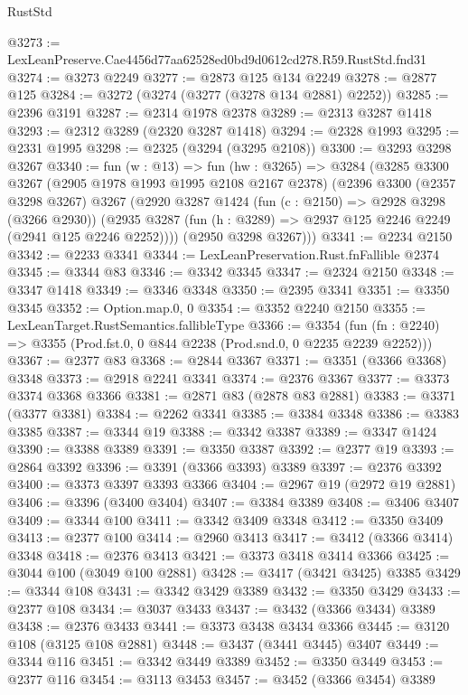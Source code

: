 \begin{lexlean}{RustStd}
\begin{coremodule}
@3273 := LexLeanPreserve.Cae4456d77aa62528ed0bd9d0612cd278.R59.RustStd.fnd31
@3274 := @3273 @2249
@3277 := @2873 @125 @134 @2249
@3278 := @2877 @125
@3284 := @3272 (@3274 (@3277 (@3278 @134 @2881) @2252))
@3285 := @2396 @3191
@3287 := @2314 @1978 @2378
@3289 := @2313 @3287 @1418
@3293 := @2312 @3289 (@2320 @3287 @1418)
@3294 := @2328 @1993
@3295 := @2331 @1995
@3298 := @2325 (@3294 (@3295 @2108))
@3300 := @3293 @3298 @3267
@3340 := fun (w : @13) =>
  fun (hw : @3265) =>
  @3284
    (@3285
      @3300
      @3267
      (@2905 @1978 @1993 @1995 @2108 @2167 @2378)
      (@2396
        @3300
        (@2357 @3298 @3267)
        @3267
        (@2920
          @3287
          @1424
          (fun (c : @2150) => @2928 @3298 (@3266 @2930))
          (@2935 @3287 (fun (h : @3289) => @2937 @125 @2246 @2249 (@2941 @125 @2246 @2252))))
        (@2950 @3298 @3267)))
@3341 := @2234 @2150
@3342 := @2233 @3341
@3344 := LexLeanPreservation.Rust.fnFallible @2374
@3345 := @3344 @83
@3346 := @3342 @3345
@3347 := @2324 @2150
@3348 := @3347 @1418
@3349 := @3346 @3348
@3350 := @2395 @3341
@3351 := @3350 @3345
@3352 := Option.map.{0, 0}
@3354 := @3352 @2240 @2150
@3355 := LexLeanTarget.RustSemantics.fallibleType
@3366 := @3354
    (fun (fn : @2240) => @3355 (Prod.fst.{0, 0} @844 @2238 (Prod.snd.{0, 0} @2235 @2239 @2252)))
@3367 := @2377 @83
@3368 := @2844 @3367
@3371 := @3351 (@3366 @3368) @3348
@3373 := @2918 @2241 @3341
@3374 := @2376 @3367
@3377 := @3373 @3374 @3368 @3366
@3381 := @2871 @83 (@2878 @83 @2881)
@3383 := @3371 (@3377 @3381)
@3384 := @2262 @3341
@3385 := @3384 @3348
@3386 := @3383 @3385
@3387 := @3344 @19
@3388 := @3342 @3387
@3389 := @3347 @1424
@3390 := @3388 @3389
@3391 := @3350 @3387
@3392 := @2377 @19
@3393 := @2864 @3392
@3396 := @3391 (@3366 @3393) @3389
@3397 := @2376 @3392
@3400 := @3373 @3397 @3393 @3366
@3404 := @2967 @19 (@2972 @19 @2881)
@3406 := @3396 (@3400 @3404)
@3407 := @3384 @3389
@3408 := @3406 @3407
@3409 := @3344 @100
@3411 := @3342 @3409 @3348
@3412 := @3350 @3409
@3413 := @2377 @100
@3414 := @2960 @3413
@3417 := @3412 (@3366 @3414) @3348
@3418 := @2376 @3413
@3421 := @3373 @3418 @3414 @3366
@3425 := @3044 @100 (@3049 @100 @2881)
@3428 := @3417 (@3421 @3425) @3385
@3429 := @3344 @108
@3431 := @3342 @3429 @3389
@3432 := @3350 @3429
@3433 := @2377 @108
@3434 := @3037 @3433
@3437 := @3432 (@3366 @3434) @3389
@3438 := @2376 @3433
@3441 := @3373 @3438 @3434 @3366
@3445 := @3120 @108 (@3125 @108 @2881)
@3448 := @3437 (@3441 @3445) @3407
@3449 := @3344 @116
@3451 := @3342 @3449 @3389
@3452 := @3350 @3449
@3453 := @2377 @116
@3454 := @3113 @3453
@3457 := @3452 (@3366 @3454) @3389

\end{coremodule}
\end{lexlean}
